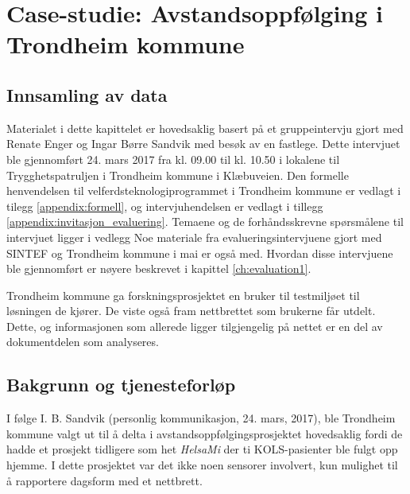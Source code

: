 \chapter{Case-studie: Avstandsoppfølging i Trondheim kommune}
\label{ch:case}

\section{Innsamling av data}
Materialet i dette kapittelet er hovedsaklig basert på et gruppeintervju gjort med Renate Enger og Ingar Børre Sandvik med besøk
av en fastlege. Dette intervjuet ble gjennomført 24. mars 2017 fra kl. 09.00 til kl. 10.50 i lokalene til Trygghetspatruljen i
Trondheim kommune i Klæbuveien. Den formelle henvendelsen til velferdsteknologiprogrammet i Trondheim kommune er vedlagt i
tilegg \ref{appendix:formell}, og intervjuhendelsen er vedlagt i tillegg \ref{appendix:invitasjon_evaluering}. Temaene og
de forhåndsskrevne spørsmålene til intervjuet ligger i vedlegg %
Noe materiale fra evalueringsintervjuene gjort med SINTEF og Trondheim kommune i mai er
også med. Hvordan disse intervjuene ble gjennomført er nøyere beskrevet i kapittel \ref{ch:evaluation1}.

Trondheim kommune ga forskningsprosjektet en bruker til testmiljøet til løsningen de kjører. De viste også fram
nettbrettet som brukerne får utdelt. Dette, og informasjonen som allerede ligger tilgjengelig på nettet er en del
av dokumentdelen som analyseres.

\section{Bakgrunn og tjenesteforløp}
I følge I. B. Sandvik (personlig kommunikasjon, 24. mars, 2017), ble Trondheim kommune valgt ut til å delta i avstandsoppfølgingsprosjektet hovedsaklig fordi de hadde et
prosjekt tidligere som het \textit{HelsaMi} der ti KOLS-pasienter ble fulgt opp hjemme. I dette prosjektet var det ikke noen sensorer involvert,
kun mulighet til å rapportere dagsform med et nettbrett.

